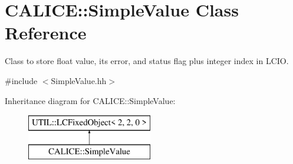 \section{C\-A\-L\-I\-C\-E\-:\-:Simple\-Value Class Reference}
\label{classCALICE_1_1SimpleValue}


Class to store float value, its error, and status flag plus integer index in L\-C\-I\-O.  




{\ttfamily \#include $<$Simple\-Value.\-hh$>$}

Inheritance diagram for C\-A\-L\-I\-C\-E\-:\-:Simple\-Value\-:\begin{figure}[H]
\begin{center}
\leavevmode
\includegraphics[height=2.000000cm]{classCALICE_1_1SimpleValue}
\end{center}
\end{figure}
